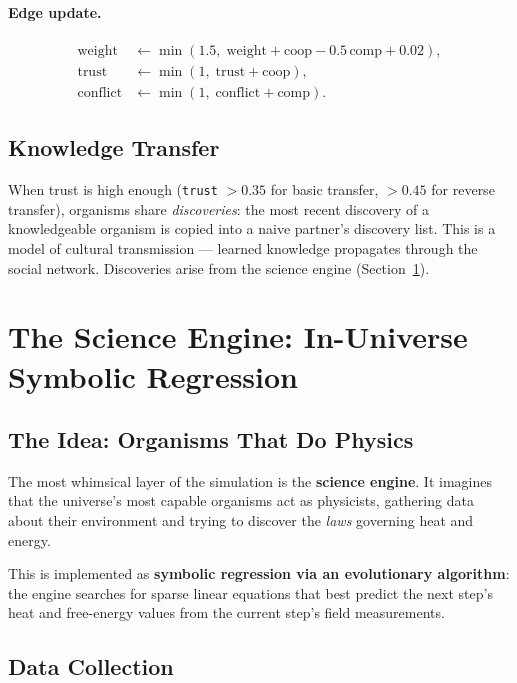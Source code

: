 \documentclass[12pt,a4paper]{article}
\begin{document}
\paragraph{Edge update.}
\begin{align}
  \text{weight} &\leftarrow \min(1.5,\;
    \text{weight} + \text{coop} - 0.5\,\text{comp} + 0.02), \\
  \text{trust} &\leftarrow \min(1,\;\text{trust} + \text{coop}), \\
  \text{conflict} &\leftarrow \min(1,\;\text{conflict} + \text{comp}).
\end{align}

\subsection{Knowledge Transfer}

When trust is high enough
(\texttt{trust} $> 0.35$ for basic transfer,
$> 0.45$ for reverse transfer),
organisms share \emph{discoveries}:
the most recent discovery of a knowledgeable organism
is copied into a naive partner's discovery list.
This is a model of cultural transmission — learned knowledge
propagates through the social network.
Discoveries arise from the science engine (Section~\ref{sec:science}).

\section{The Science Engine: In-Universe Symbolic Regression}
\label{sec:science}

\subsection{The Idea: Organisms That Do Physics}

The most whimsical layer of the simulation is the
\textbf{science engine}.
It imagines that the universe's most capable organisms
act as physicists, gathering data about their environment
and trying to discover the \emph{laws} governing heat and energy.

This is implemented as \textbf{symbolic regression via an
evolutionary algorithm}:
the engine searches for sparse linear equations
that best predict the next step's heat and free-energy values
from the current step's field measurements.

\subsection{Data Collection}
\end{document}
